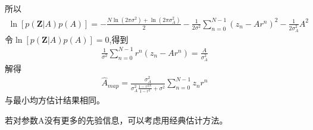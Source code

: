 \documentclass[fontset=windows]{article}
\numberwithin{figure}{section}
\begin{document}
所以
\begin{align*}
    \ln[p(\mathbf{Z}|A)p(A)]=-\frac{N\ln (2\pi \sigma^2)+\ln(2\pi \sigma^2_A)}{2}-\frac{1}{2\sigma^2}\sum_{n=0}^{N-1}(z_n-Ar^n)^2-\frac{1}{2\sigma^2_A}A^2
\end{align*}
令\(\ln[p(\mathbf{Z}|A)p(A)]=0\),得到
\begin{align*}
    \frac{1}{\sigma^2}\sum_{n=0}^{N-1}r^n(z_n-Ar^n)=\frac{A}{\sigma^2_A}
\end{align*}
解得
\begin{align*}
    \hat{A}_{map}=\frac{\sigma^2_A}{\sigma^2_A\frac{1-r^{2N}}{1-r^2}+\sigma^2}\sum_{n=0}^{N-1}z_nr^n
\end{align*}
与最小均方估计结果相同。

若对参数A没有更多的先验信息，可以考虑用经典估计方法。


\end{document}
